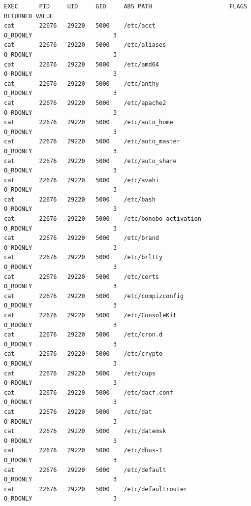 \documentclass[a4paper]{article}
\begin{document}
\begin{lstlisting}[style=esc]
EXEC      PID     UID     GID     ABS PATH                      FLAGS                      RETURNED VALUE
cat       22676   29220   5000    /etc/acct                      O_RDONLY                       3
cat       22676   29220   5000    /etc/aliases                   O_RDONLY                       3
cat       22676   29220   5000    /etc/amd64                     O_RDONLY                       3
cat       22676   29220   5000    /etc/anthy                     O_RDONLY                       3
cat       22676   29220   5000    /etc/apache2                   O_RDONLY                       3
cat       22676   29220   5000    /etc/auto_home                 O_RDONLY                       3
cat       22676   29220   5000    /etc/auto_master               O_RDONLY                       3
cat       22676   29220   5000    /etc/auto_share                O_RDONLY                       3
cat       22676   29220   5000    /etc/avahi                     O_RDONLY                       3
cat       22676   29220   5000    /etc/bash                      O_RDONLY                       3
cat       22676   29220   5000    /etc/bonobo-activation         O_RDONLY                       3
cat       22676   29220   5000    /etc/brand                     O_RDONLY                       3
cat       22676   29220   5000    /etc/brltty                    O_RDONLY                       3
cat       22676   29220   5000    /etc/certs                     O_RDONLY                       3
cat       22676   29220   5000    /etc/compizconfig              O_RDONLY                       3
cat       22676   29220   5000    /etc/ConsoleKit                O_RDONLY                       3
cat       22676   29220   5000    /etc/cron.d                    O_RDONLY                       3
cat       22676   29220   5000    /etc/crypto                    O_RDONLY                       3
cat       22676   29220   5000    /etc/cups                      O_RDONLY                       3
cat       22676   29220   5000    /etc/dacf.conf                 O_RDONLY                       3
cat       22676   29220   5000    /etc/dat                       O_RDONLY                       3
cat       22676   29220   5000    /etc/datemsk                   O_RDONLY                       3
cat       22676   29220   5000    /etc/dbus-1                    O_RDONLY                       3
cat       22676   29220   5000    /etc/default                   O_RDONLY                       3
cat       22676   29220   5000    /etc/defaultrouter             O_RDONLY                       3

\end{lstlisting}
\end{document}
